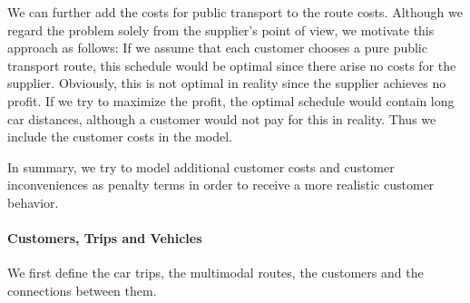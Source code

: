 We can further add the costs for public transport to the route costs. Although we regard the problem solely from the supplier's point of view, we motivate this approach as follows: If we assume that each customer chooses a pure public transport route, this schedule would be optimal since there arise no costs for the supplier. Obviously, this is not optimal in reality since the supplier achieves no profit. If we try to maximize the profit, the optimal schedule would contain long car distances, although a customer would not pay for this in reality. Thus we include the customer costs in the model.

In summary, we try to model additional customer costs and customer inconveniences as penalty terms in order to receive a more realistic customer behavior.

\newpage

\paragraph{Customers, Trips and Vehicles} \parfill

We first define the car trips, the multimodal routes, the customers and the connections between them. 

